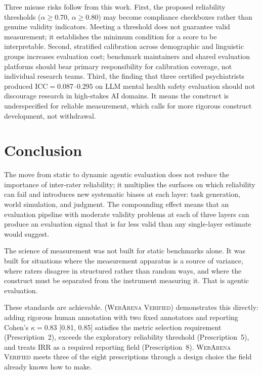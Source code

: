 \documentclass[preprint,12pt]{elsarticle}
\begin{document}
Three misuse risks follow from this work. First, the proposed reliability thresholds
($\alpha \geq 0.70$, $\alpha \geq 0.80$) may become compliance checkboxes rather
than genuine validity indicators. Meeting a threshold does not guarantee valid
measurement; it establishes the minimum condition for a score to be interpretable.
Second, stratified calibration across demographic and linguistic groups increases
evaluation cost; benchmark maintainers and shared evaluation platforms should bear
primary responsibility for calibration coverage, not individual research teams.
Third, the finding that three certified psychiatrists produced $\text{ICC} =
0.087$--$0.295$ on LLM mental health safety evaluation \citep{jafari2026} should not
discourage research in high-stakes AI domains. It means the construct is
underspecified for reliable measurement, which calls for more rigorous construct
development, not withdrawal.

\section{Conclusion}
\label{sec:conclusion}

The move from static to dynamic agentic evaluation does not reduce the importance of
inter-rater reliability; it multiplies the surfaces on which reliability can fail
and introduces new systematic biases at each layer: task generation, world
simulation, and judgment. The compounding effect means that an evaluation pipeline
with moderate validity problems at each of three layers can produce an evaluation
signal that is far less valid than any single-layer estimate would suggest.

The science of measurement was not built for static benchmarks alone. It was built
for situations where the measurement apparatus is a source of variance, where raters
disagree in structured rather than random ways, and where the construct must be
separated from the instrument measuring it. That is agentic evaluation.

These standards are achievable. \citet{elhattami2025} (\textsc{WebArena Verified})
demonstrates this directly: adding rigorous human annotation with two fixed annotators
and reporting Cohen's $\kappa = 0.83$ [0.81, 0.85] satisfies the metric selection
requirement (Prescription~2), exceeds the exploratory reliability threshold
(Prescription~5), and treats IRR as a required reporting field (Prescription~8).
\textsc{WebArena Verified} meets three of the eight prescriptions through a design
choice the field already knows how to make.
\end{document}
